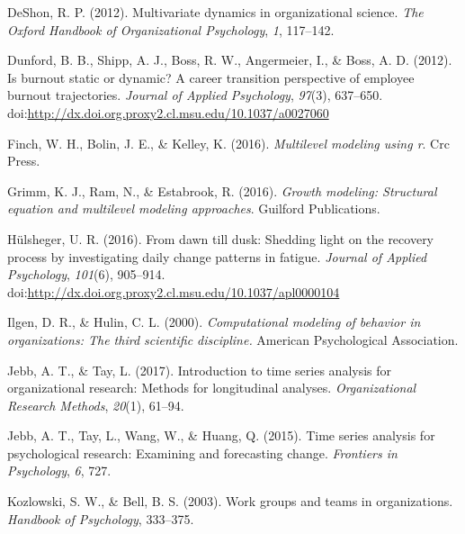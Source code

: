 \documentclass[english,,man]{apa6}
\theoremstyle{definition}
\theoremstyle{definition}
\theoremstyle{definition}
\theoremstyle{remark}
\begin{document}
\leavevmode\hypertarget{ref-deshon_multivariate_2012}{}%
DeShon, R. P. (2012). Multivariate dynamics in organizational science.
\emph{The Oxford Handbook of Organizational Psychology}, \emph{1},
117--142.

\leavevmode\hypertarget{ref-dunford_is_2012}{}%
Dunford, B. B., Shipp, A. J., Boss, R. W., Angermeier, I., \& Boss, A.
D. (2012). Is burnout static or dynamic? A career transition perspective
of employee burnout trajectories. \emph{Journal of Applied Psychology},
\emph{97}(3), 637--650.
doi:\href{https://doi.org/http://dx.doi.org.proxy2.cl.msu.edu/10.1037/a0027060}{http://dx.doi.org.proxy2.cl.msu.edu/10.1037/a0027060}

\leavevmode\hypertarget{ref-finch2016multilevel}{}%
Finch, W. H., Bolin, J. E., \& Kelley, K. (2016). \emph{Multilevel
modeling using r}. Crc Press.

\leavevmode\hypertarget{ref-grimm_growth_2016}{}%
Grimm, K. J., Ram, N., \& Estabrook, R. (2016). \emph{Growth modeling:
Structural equation and multilevel modeling approaches}. Guilford
Publications.

\leavevmode\hypertarget{ref-hulsheger_dawn_2016}{}%
Hülsheger, U. R. (2016). From dawn till dusk: Shedding light on the
recovery process by investigating daily change patterns in fatigue.
\emph{Journal of Applied Psychology}, \emph{101}(6), 905--914.
doi:\href{https://doi.org/http://dx.doi.org.proxy2.cl.msu.edu/10.1037/apl0000104}{http://dx.doi.org.proxy2.cl.msu.edu/10.1037/apl0000104}

\leavevmode\hypertarget{ref-ilgen_computational_2000}{}%
Ilgen, D. R., \& Hulin, C. L. (2000). \emph{Computational modeling of
behavior in organizations: The third scientific discipline.} American
Psychological Association.

\leavevmode\hypertarget{ref-jebb_introduction_2017}{}%
Jebb, A. T., \& Tay, L. (2017). Introduction to time series analysis for
organizational research: Methods for longitudinal analyses.
\emph{Organizational Research Methods}, \emph{20}(1), 61--94.

\leavevmode\hypertarget{ref-jebb_time_2015}{}%
Jebb, A. T., Tay, L., Wang, W., \& Huang, Q. (2015). Time series
analysis for psychological research: Examining and forecasting change.
\emph{Frontiers in Psychology}, \emph{6}, 727.

\leavevmode\hypertarget{ref-kozlowski_work_2003}{}%
Kozlowski, S. W., \& Bell, B. S. (2003). Work groups and teams in
organizations. \emph{Handbook of Psychology}, 333--375.
\end{document}
